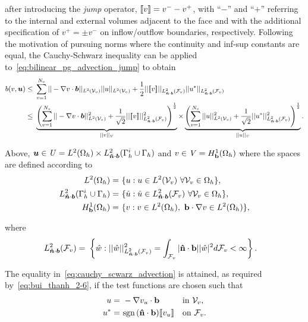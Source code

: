 after introducing the \textit{jump} operator, ${\llbracket v\rrbracket} = v^- - v^+ $, with ``$-$'' and ``$+$'' referring to the
internal and external volumes adjacent to the face and with the additional specification of $v^+ = \pm v^-$ on
inflow/outflow boundaries, respectively. Following the motivation of pursuing norms where the continuity and inf-sup
constants are equal, the Cauchy-Schwarz inequality can be applied to~\eqref{eq:bilinear_pg_advection_jump} to obtain
\begin{align} \label{eq:cauchy_scwarz_advection}
b(v,\varg{u})
\le\ & \sum_{v=1}^{N_v}
|| - \nabla v \cdot \varv{b} ||_{L^2(\fe{V}_v)} || u ||_{L^2(\fe{V}_v)}
+
\frac{1}{2} ||\jump{v}||_{L^2_{\varv{\hat{n}}\cdot\varv{b}}(\fe{F}_v)}
||u^*||_{L^2_{\varv{\hat{n}}\cdot\varv{b}}(\fe{F}_v)} \\
\le\ &
\underbrace{\left(
\sum_{v=1}^{N_v} || - \nabla v \cdot \varv{b} ||^2_{L^2(\fe{V}_v)} + \frac{1}{\sqrt{2}} ||\jump{v}||^2_{L^2_{\varv{\hat{n}}\cdot\varv{b}}(\fe{F}_v)}
\right)^\frac{1}{2}}_{||v||_\fspace{V}}
\times
\underbrace{\left(
\sum_{v=1}^{N_v} || u ||^2_{L^2(\fe{V}_v)} + \frac{1}{\sqrt{2}} ||u^*||^2_{L^2_{\varv{\hat{n}}\cdot\varv{b}}(\fe{F}_v)}
\right)^\frac{1}{2}}_{||u||_\fspace{U}}.
\end{align}

Above, $\mathit{\bm{{u}}} \in \mathit{{{U}}} = L^2(\Omega_h) \times L^2_{\mathit{\bm{{\hat{n}}}}\cdot\mathit{\bm{{b}}}}(\Gamma_h^i \cup
\Gamma_h)$ and $v \in \mathit{{{V}}} = H^1_{\mathbf{{b}}}(\Omega_h)$ where the spaces are defined according to
\begin{align}
L^2(\Omega_h)
=\ & \{ u : u \in L^2(\fe{V}_v)\ \forall \fe{V}_v \in \Omega_h \}, \\
L^2_{\varv{\hat{n}}\cdot\varv{b}}(\Gamma_h^i \cup \Gamma_h)
=\ & \{ \hat{u} : \hat{u} \in L^2_{\varv{\hat{n}}\cdot\varv{b}}(\fe{F}_v)\ \forall \fe{V}_v \in \Omega_h \}, \\
H^1_{\vect{b}}(\Omega_h)
=\ & \{ v : v \in L^2(\Omega_h),\ \vect{b} \cdot \nabla v \in L^2(\Omega_h) \},
\end{align}

where
\begin{align}
L^2_{\mathit{\bm{{\hat{n}}}}\cdot\mathit{\bm{{b}}}}(\mathcal{{{F}}}_v)
=\ & \left\{ \hat{w} : || \hat{w} ||^2_{L^2_{\mathit{\bm{{\hat{n}}}}\cdot\mathit{\bm{{b}}}}(\mathcal{{{F}}}_v)} = \int_{\mathcal{{{F}}}_v} |\mathbf{{\hat{n}}} \cdot
\mathbf{{b}}| |\hat{w}|^2 d\mathcal{{{F}}}_v < \infty \right\}.
\end{align}

 The equality in~\eqref{eq:cauchy_scwarz_advection} is attained, as required by~\eqref{eq:bui_thanh_2-6}, if
the test functions are chosen such that
\begin{align}
u =\ & -\nabla v_u \cdot \vect{b} && \text{in}\ \fe{V}_v, \\
u^* =\ & \sign{\vect{\hat{n}} \cdot \vect{b}} \jump{v_u} && \text{on}\ \fe{F}_v.
\end{align}

